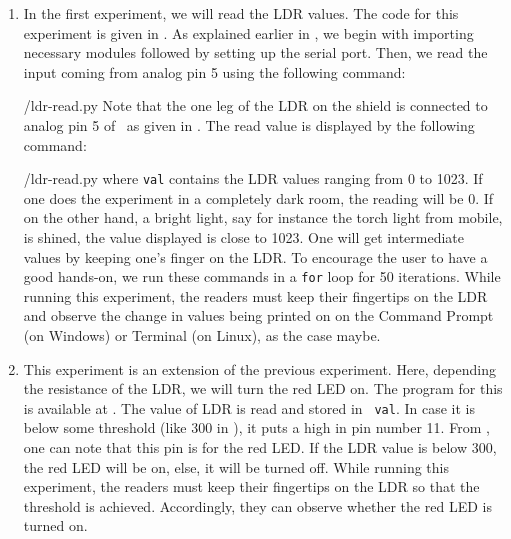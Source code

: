 \begin{enumerate}
  \item In the first experiment, we will read the LDR values. The code for this experiment is given in
        . As explained earlier in , we begin with 
        importing necessary modules followed by setting up the serial port. 
        Then, we read the input coming from analog pin 5 using the
        following command:
        
        {\LocLDRpycode/ldr-read.py} Note that the one leg of the LDR on
        the shield is connected to analog pin 5 of \arduino\, 
        as given in . The read value is displayed 
        by the following command: 
        
        {\LocLDRpycode/ldr-read.py} where {\tt val} contains
        the LDR values ranging from 0 to 1023. If one does the experiment in a completely dark room, the
        reading will be 0. If on the other hand, a bright light, say for instance the torch
        light from mobile, is shined, the value displayed is close to 1023. One will get
        intermediate values by keeping one's finger on the LDR. To
        encourage the user to have a good hands-on, we run these commands in
        a {\tt for} loop for 50 iterations. While running this experiment, the readers must keep their fingertips on the LDR and
        observe the change in values being printed on on the
        Command Prompt (on Windows) or Terminal (on Linux), as the case maybe.
        
  \item This experiment is an extension of the previous experiment. Here, depending the resistance of the LDR, we will
        turn the red LED on.  The program for this is available at
        .  The value of LDR is read and stored in {\tt
            val}.  In case it is below some threshold (like 300 in ), 
        it puts a high in pin number 11.  From , 
        one can note that this pin is for the red LED.  If the LDR value is below 300, 
        the red LED will be on, else, it will be turned off.  
        While running this experiment, the readers 
        must keep their fingertips on the LDR so that the threshold is achieved. Accordingly, 
        they can observe whether the red LED is turned on. 
        
        
\end{enumerate}

